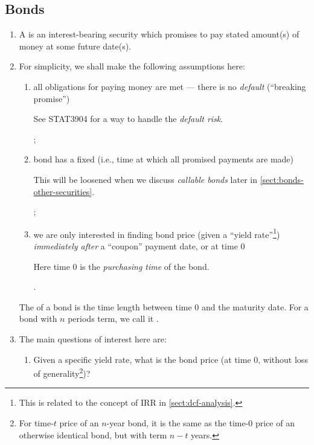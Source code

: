 \subsection{Bonds}
\begin{enumerate}
\item A  is an interest-bearing security which promises to pay
stated amount(s) of money at some future date(s).

\item For simplicity, we shall make the
following assumptions here:
\begin{enumerate}
\item all obligations for paying money are met --- there is no \emph{default}
(``breaking promise'') \begin{note}
See STAT3904 for a way to handle the \emph{default risk}.
\end{note};
\item bond has a fixed  (i.e., time at which all promised
payments are made)
\begin{note}
This will be loosened when we discuss
\emph{callable bonds} later in \cref{sect:bonds-other-securities}.
\end{note};
\item we are only interested in finding bond price (given a ``yield
rate''\footnote{This is related to the concept of IRR in
\cref{sect:dcf-analysis}.}) \emph{immediately after} a ``coupon'' payment date,
or at time 0 \begin{note} Here time 0 is the \emph{purchasing time} of the
bond.
\end{note}.
\end{enumerate}
\begin{note}
The  of a bond is the time length between time 0 and the maturity date.
For a bond with \(n\) periods term, we call it .
\end{note}
\item \label{it:bond-main-qs}
The main questions of interest here are:
\begin{enumerate}
\item Given a specific yield rate, what is the bond price (at time 0, without
loss of generality\footnote{For time-\(t\) price of an \(n\)-year bond, it is
the same as the time-0 price of an otherwise identical bond, but with term
\(n-t\) years.})?


\end{enumerate}
\end{enumerate}
